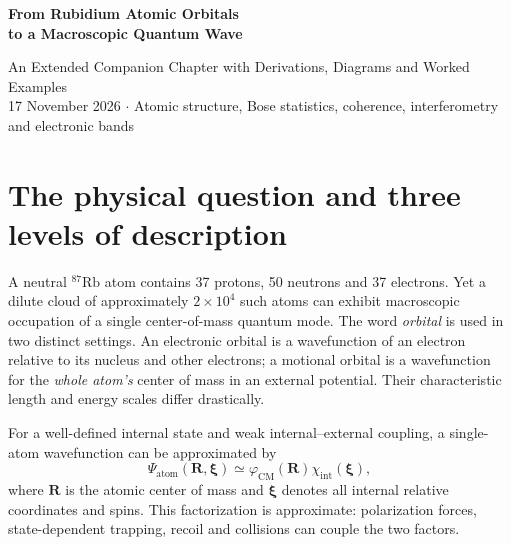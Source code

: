 \documentclass[11pt,a4paper]{article}
\newcommand{\Rb}{^{87}\mathrm{Rb}}
\newcommand{\ph}{\varphi}
\newcommand{\cm}{\mathrm{CM}}
\begin{document}
\begin{center}
{\Large\bfseries\color{deepblue} From Rubidium Atomic Orbitals\\ to a Macroscopic Quantum Wave}\par\medskip
{\large An Extended Companion Chapter with Derivations, Diagrams and Worked Examples}\\[4pt]
{\small 17 November 2026 \quad $\cdot$ \quad Atomic structure, Bose statistics, coherence, interferometry and electronic bands}
\end{center}
\vspace{3mm}
\begin{abstract}
This chapter explains how thousands of neutral $\Rb$ atoms can occupy one coherent motional quantum state without merging their nuclei or electronic orbitals. Starting from the electron configuration $[\mathrm{Kr}]5s^1$, we distinguish internal electronic and external center-of-mass wavefunctions, derive atomic transition selection rules, build the Bose many-body state in first and second quantization, introduce the Penrose--Onsager criterion and Gross--Pitaevskii dynamics, calculate laboratory energy and length scales, and contrast ultracold quantum gases with electronic band formation in crystals. The November 2026 Tiangong experiment provides a contemporary experimental context; its picokelvin number is an equivalent expansion-energy temperature, not a thermometer reading for the entire apparatus.
\end{abstract}
\tableofcontents
\newpage
\section{The physical question and three levels of description}
A neutral $\Rb$ atom contains 37 protons, 50 neutrons and 37 electrons. Yet a dilute cloud of approximately $2\times 10^4$ such atoms can exhibit macroscopic occupation of a single center-of-mass quantum mode. The word \emph{orbital} is used in two distinct settings. An electronic orbital is a wavefunction of an electron relative to its nucleus and other electrons; a motional orbital is a wavefunction for the \emph{whole atom's} center of mass in an external potential. Their characteristic length and energy scales differ drastically.

For a well-defined internal state and weak internal--external coupling, a single-atom wavefunction can be approximated by
\begin{equation}
\Psi_{\mathrm{atom}}(\mathbf R,\boldsymbol\xi) \simeq \ph_{\cm}(\mathbf R)\chi_{\mathrm{int}}(\boldsymbol\xi),
\label{eq:factor}
\end{equation}
where $\mathbf R$ is the atomic center of mass and $\boldsymbol\xi$ denotes all internal relative coordinates and spins. This factorization is approximate: polarization forces, state-dependent trapping, recoil and collisions can couple the two factors.
\end{document}
